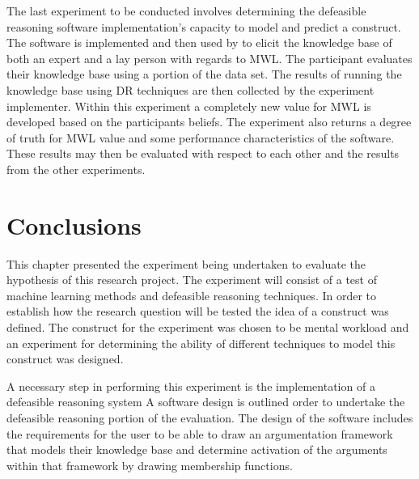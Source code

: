 The last experiment to be conducted involves determining the defeasible reasoning software implementation's capacity to model and predict a construct. The software is implemented and then used by to elicit the knowledge base of both an expert and a lay person with regards to MWL. The participant evaluates their knowledge base using a portion of the data set. The results of running the knowledge base using DR techniques are then collected by the experiment implementer. Within this experiment a completely new value for MWL is developed based on the participants beliefs. The experiment also returns a degree of truth for MWL value and some performance characteristics of the software. These results may then be evaluated with respect to each other and the results from the other experiments. 

\section{Conclusions}

This chapter presented the experiment being undertaken to evaluate the hypothesis of this research project. The experiment will consist of a test of machine learning methods and defeasible reasoning techniques. In order to establish how the research question will be tested the idea of a construct was defined. The construct for the experiment was chosen to be mental workload and an experiment for determining the ability of different techniques to model this construct was designed.

A necessary step in performing this experiment is the implementation of a defeasible reasoning system A software design is outlined order to undertake the defeasible reasoning portion of the evaluation. The design of the software includes the requirements for the user to be able to draw an argumentation framework that models their knowledge base and determine activation of the arguments within that framework by drawing membership functions.